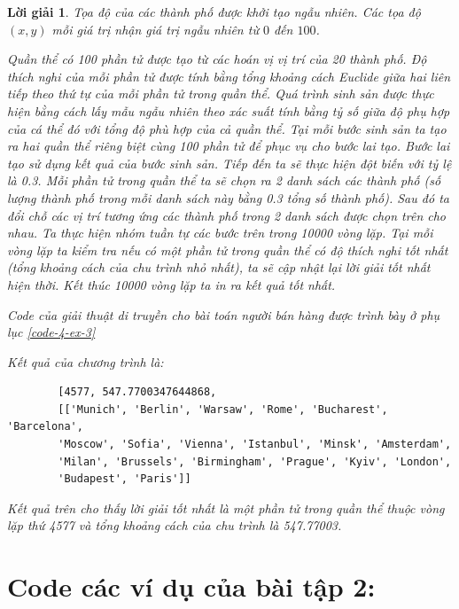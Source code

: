 \documentclass[14pt, a4paper]{article}
\theoremstyle{sltheorem}
\theoremstyle{soltheorem}
\newtheorem*{loigiai}{Lời giải}
\begin{document}
\begin{loigiai}
    Tọa độ của các thành phố được khởi tạo ngẫu nhiên. Các tọa độ $(x, y)$ mỗi giá trị nhận giá trị ngẫu nhiên từ $0$ đến $100$.

    Quần thể có 100 phần tử được tạo từ các hoán vị vị trí của 20 thành phố.
    Độ thích nghi của mỗi phần tử được tính bằng tổng khoảng cách Euclide giữa hai liên tiếp theo thứ tự của mỗi phần tử trong quần thể.
    Quá trình sinh sản được thực hiện bằng cách lấy mẫu ngẫu nhiên theo xác suất tính bằng tỷ số giữa độ phụ hợp của cá thể đó với tổng độ phù hợp của cả quần thể.
    Tại mỗi bước sinh sản ta tạo ra hai quần thể riêng biệt cùng 100 phần tử để phục vụ cho bước lai tạo.
    Bước lai tạo sử dụng kết quả của bước sinh sản.
    Tiếp đến ta sẽ thực hiện đột biến với tỷ lệ là 0.3.
    Mỗi phần tử trong quần thể ta sẽ chọn ra 2 danh sách các thành phố (số lượng thành phố trong mỗi danh sách này bằng 0.3 tổng số thành phố).
    Sau đó ta đổi chỗ các vị trí tương ứng các thành phố trong 2 danh sách được chọn trên cho nhau.
    Ta thực hiện nhóm tuần tự các bước trên trong 10000 vòng lặp.
    Tại mỗi vòng lặp ta kiểm tra nếu có một phần tử trong quần thể có độ thích nghi tốt nhất (tổng khoảng cách của chu trình nhỏ nhất),
    ta sẽ cập nhật lại lời giải tốt nhất hiện thời.
    Kết thúc 10000 vòng lặp ta in ra kết quả tốt nhất.

    Code của giải thuật di truyền cho bài toán người bán hàng được trình bày ở phụ lục \ref{code-4-ex-3}

    Kết quả của chương trình là:

    \begin{verbatim}
        [4577, 547.7700347644868, 
        [['Munich', 'Berlin', 'Warsaw', 'Rome', 'Bucharest', 'Barcelona',      
        'Moscow', 'Sofia', 'Vienna', 'Istanbul', 'Minsk', 'Amsterdam',
        'Milan', 'Brussels', 'Birmingham', 'Prague', 'Kyiv', 'London',
        'Budapest', 'Paris']]
    \end{verbatim}

    Kết quả trên cho thấy lời giải tốt nhất là một phần tử trong quần thể thuộc vòng lặp thứ 4577 và tổng khoảng cách của chu trình là 547.77003.

    \end{loigiai}

    
    \newpage
    \printbibliography[title={TÀI LIỆU THAM KHẢO}]

    \newpage

    \appendix

    \section{Code các ví dụ của bài tập 2:}
\end{document}
